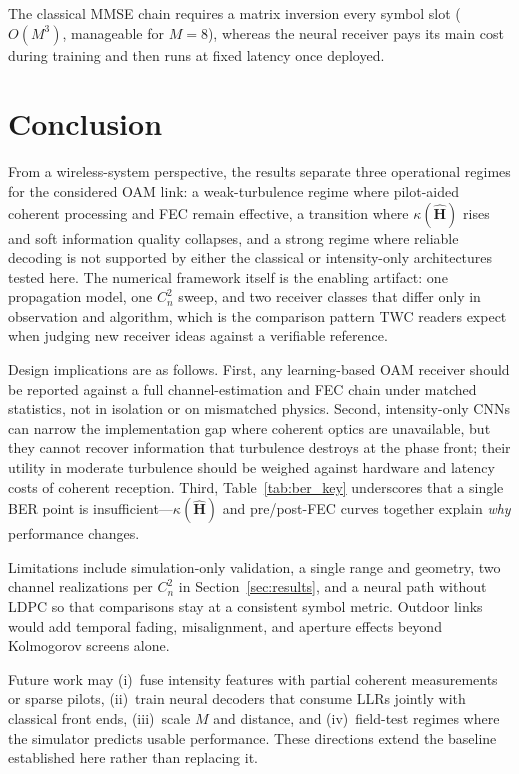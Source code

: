 \documentclass[journal]{IEEEtran}
\begin{document}
The classical MMSE chain requires a matrix inversion every symbol slot ($O(M^3)$, manageable for $M=8$), whereas the neural receiver pays its main cost during training and then runs at fixed latency once deployed.

\section{Conclusion}
\label{sec:conclusion}

From a wireless-system perspective, the results separate three operational regimes for the considered OAM link: a weak-turbulence regime where pilot-aided coherent processing and FEC remain effective, a transition where $\kappa(\hat{\mathbf{H}})$ rises and soft information quality collapses, and a strong regime where reliable decoding is not supported by either the classical or intensity-only architectures tested here. The numerical framework itself is the enabling artifact: one propagation model, one $C_n^2$ sweep, and two receiver classes that differ only in observation and algorithm, which is the comparison pattern TWC readers expect when judging new receiver ideas against a verifiable reference.

Design implications are as follows. First, any learning-based OAM receiver should be reported against a full channel-estimation and FEC chain under matched statistics, not in isolation or on mismatched physics. Second, intensity-only CNNs can narrow the implementation gap where coherent optics are unavailable, but they cannot recover information that turbulence destroys at the phase front; their utility in moderate turbulence should be weighed against hardware and latency costs of coherent reception. Third, Table~\ref{tab:ber_key} underscores that a single BER point is insufficient---$\kappa(\hat{\mathbf{H}})$ and pre/post-FEC curves together explain \emph{why} performance changes.

Limitations include simulation-only validation, a single range and geometry, two channel realizations per $C_n^2$ in Section~\ref{sec:results}, and a neural path without LDPC so that comparisons stay at a consistent symbol metric. Outdoor links would add temporal fading, misalignment, and aperture effects beyond Kolmogorov screens alone.

Future work may (i)~fuse intensity features with partial coherent measurements or sparse pilots, (ii)~train neural decoders that consume LLRs jointly with classical front ends, (iii)~scale $M$ and distance, and (iv)~field-test regimes where the simulator predicts usable performance. These directions extend the baseline established here rather than replacing it.



\end{document}
